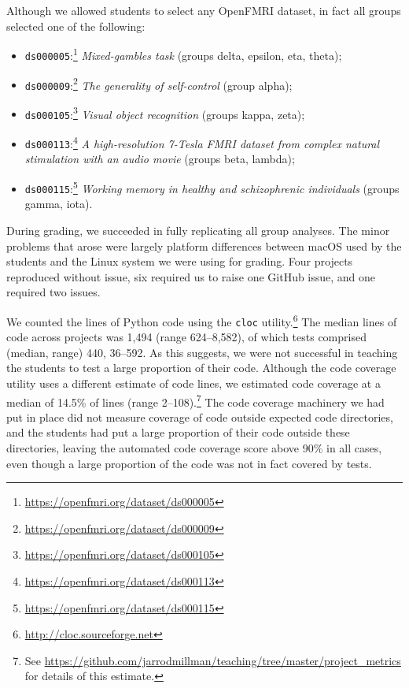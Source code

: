 Although we allowed students to select any OpenFMRI dataset, in fact all
groups selected one of the following:

\begin{itemize}

\item
    \texttt{ds000005}:\footnote{\url{https://openfmri.org/dataset/ds000005}}
        \textit{Mixed-gambles task} \citep{tom2007neural} (groups delta,
        epsilon, eta, theta);

\item
    \texttt{ds000009}:\footnote{\url{https://openfmri.org/dataset/ds000009}}
        \textit{The generality of self-control} \citep{cohen2014generality}
        (group alpha);

\item
    \texttt{ds000105}:\footnote{\url{https://openfmri.org/dataset/ds000105}}
        \textit{Visual object recognition} \citep{haxby2001distributed}
        (groups kappa, zeta);

\item
    \texttt{ds000113}:\footnote{\url{https://openfmri.org/dataset/ds000113}}
        \textit{A high-resolution 7-Tesla FMRI dataset from complex natural
        stimulation with an audio movie} \citep{hanke2014high} (groups beta,
        lambda);

\item
    \texttt{ds000115}:\footnote{\url{https://openfmri.org/dataset/ds000115}}
        \textit{Working memory in healthy and schizophrenic individuals}
        \citep{repovs2012working} (groups gamma, iota).

\end{itemize}

During grading, we succeeded in fully replicating all group analyses.  The
minor problems that arose were largely platform differences between macOS used
by the students and the Linux system we were using for grading.  Four projects
reproduced without issue, six required us to raise one GitHub issue, and one
required two issues.

We counted the lines of Python code using the \texttt{cloc}
utility.\footnote{\url{http://cloc.sourceforge.net}}  The median lines of code
across projects was 1,494 (range 624--8,582), of which tests comprised (median,
range) 440, 36--592.  As this suggests, we were not successful in teaching the
students to test a large proportion of their code.  Although the code coverage
utility uses a different estimate of code lines, we estimated code coverage at
a median of 14.5\% of lines (range 2--108).\footnote{See
\url{https://github.com/jarrodmillman/teaching/tree/master/project_metrics}
for details of this estimate.}  The code coverage machinery we
had put in place did not measure coverage of code outside expected code
directories, and the students had put a large proportion of their code outside
these directories, leaving the automated code coverage score above 90\% in all
cases, even though a large proportion of the code was not in fact covered by
tests.

